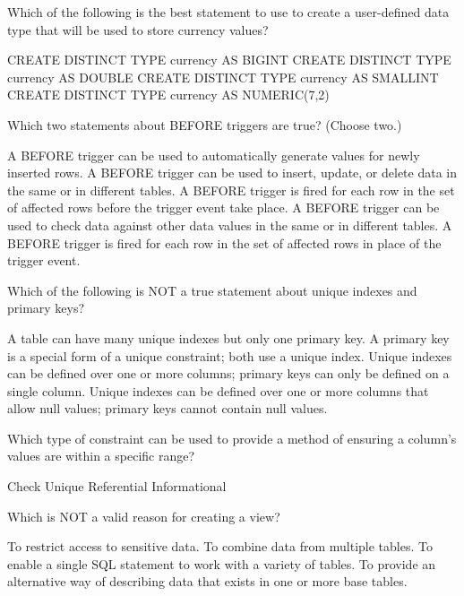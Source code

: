 \documentclass[11pt]{exam}
\begin{document}
\begin{questions}
\question[1]
Which of the following is the best statement to use to create a user-defined data type that will be used
to store currency values?
\begin{choices}
\choice CREATE DISTINCT TYPE currency AS BIGINT
\choice CREATE DISTINCT TYPE currency AS DOUBLE
\choice CREATE DISTINCT TYPE currency AS SMALLINT
\choice CREATE DISTINCT TYPE currency AS NUMERIC(7,2)
\end{choices}

\question[1]
Which two statements about BEFORE triggers are true? (Choose two.)
\begin{choices}
\choice A BEFORE trigger can be used to automatically generate values for newly inserted rows.
\choice A BEFORE trigger can be used to insert, update, or delete data in the same or in different tables.
\choice A BEFORE trigger is fired for each row in the set of affected rows before the trigger event take
place.
\choice A BEFORE trigger can be used to check data against other data values in the same or in different
tables.
\choice A BEFORE trigger is fired for each row in the set of affected rows in place of the trigger event.
\end{choices}

\question[1]
Which of the following is NOT a true statement about unique indexes and primary keys?
\begin{choices}
\choice A table can have many unique indexes but only one primary key.
\choice A primary key is a special form of a unique constraint; both use a unique index.
\choice Unique indexes can be defined over one or more columns; primary keys can only be defined on a 
single column.
\choice Unique indexes can be defined over one or more columns that allow null values; primary keys cannot
contain null values.
\end{choices}

\question[1]
Which type of constraint can be used to provide a method of ensuring a column's values are within a 
specific range?
\begin{choices}
\choice Check
\choice Unique
\choice Referential
\choice Informational
\end{choices}

\question[1]
Which is NOT a valid reason for creating a view?
\begin{choices}
\choice To restrict access to sensitive data.
\choice To combine data from multiple tables.
\choice To enable a single SQL statement to work with a variety of tables.
\choice To provide an alternative way of describing data that exists in one or more base tables.
\end{choices}


\end{questions}
\end{document}
